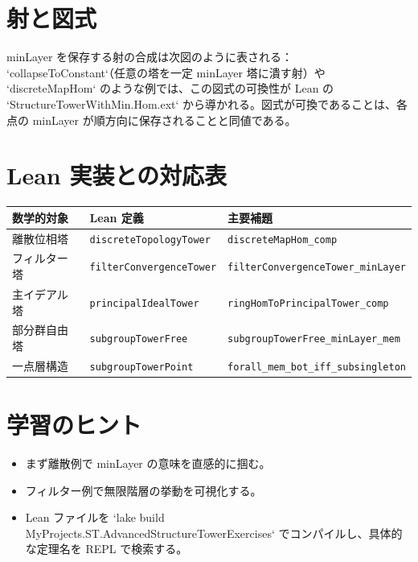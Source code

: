 \documentclass[a4paper]{ltjsarticle}
\theoremstyle{definition}
\theoremstyle{plain}
\theoremstyle{remark}
\begin{document}
\section{射と図式}
minLayer を保存する射の合成は次図のように表される：
`collapseToConstant`（任意の塔を一定 minLayer 塔に潰す射）や `discreteMapHom` のような例では、この図式の可換性が Lean の `StructureTowerWithMin.Hom.ext` から導かれる。図式が可換であることは、各点の minLayer が順方向に保存されることと同値である。

\section{Lean 実装との対応表}
\begin{center}
\begin{tabular}{lll}
\toprule
数学的対象 & Lean 定義 & 主要補題 \\
\midrule
離散位相塔 & \verb|discreteTopologyTower| & \verb|discreteMapHom_comp| \\
フィルター塔 & \verb|filterConvergenceTower| & \verb|filterConvergenceTower_minLayer| \\
主イデアル塔 & \verb|principalIdealTower| & \verb|ringHomToPrincipalTower_comp| \\
部分群自由塔 & \verb|subgroupTowerFree| & \verb|subgroupTowerFree_minLayer_mem| \\
一点層構造 & \verb|subgroupTowerPoint| & \verb|forall_mem_bot_iff_subsingleton| \\
\bottomrule
\end{tabular}
\end{center}

\section{学習のヒント}
\begin{itemize}
  \item まず離散例で minLayer の意味を直感的に掴む。
  \item フィルター例で無限階層の挙動を可視化する。
  \item Lean ファイルを `lake build MyProjects.ST.AdvancedStructureTowerExercises` でコンパイルし、具体的な定理名を REPL で検索する。
\end{itemize}
\end{document}
